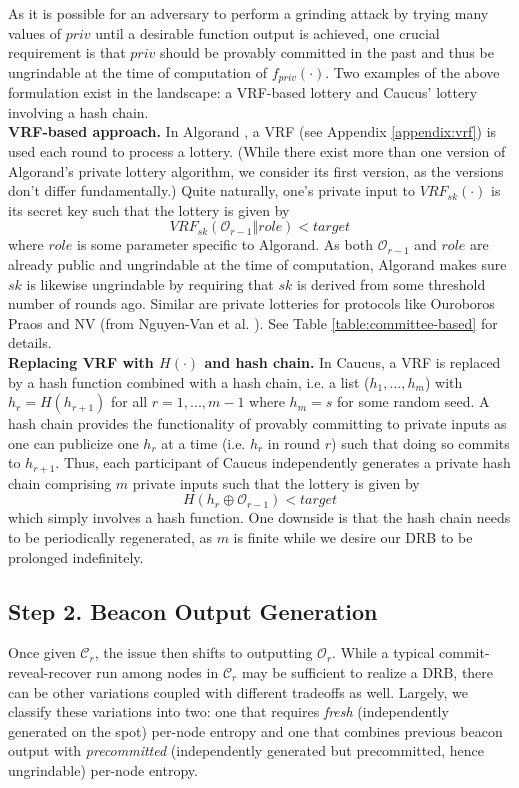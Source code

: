 \documentclass[letterpaper,twocolumn,10pt]{article}
\theoremstyle{definition}
\theoremstyle{remark}
\begin{document}
As it is possible for an adversary to perform a grinding attack by trying many values of $priv$ until a desirable function output is achieved, one crucial requirement is that $priv$ should be provably committed in the past and thus be ungrindable at the time of computation of $f_{priv}(\cdot)$. Two examples of the above formulation exist in the landscape: a VRF-based lottery and Caucus' \cite{azouvi2018winning} lottery involving a hash chain.\\

\noindent\textbf{VRF-based approach.} In Algorand \cite{gilad2017algorand}, a VRF (see Appendix \ref{appendix:vrf}) is used each round to process a lottery. (While there exist more than one version of Algorand's private lottery algorithm, we consider its first version, as the versions don't differ fundamentally.) Quite naturally, one's private input to $VRF_{sk}(\cdot)$ is its secret key such that the lottery is given by
\[
VRF_{sk}(\mathcal{O}_{r - 1} \mathbin\Vert role) < target
\]
where $role$ is some parameter specific to Algorand. As both $\mathcal{O}_{r - 1}$ and $role$ are already public and ungrindable at the time of computation, Algorand makes sure $sk$ is likewise ungrindable by requiring that $sk$ is derived from some threshold number of rounds ago. Similar are private lotteries for protocols like Ouroboros Praos \cite{david2018ouroboros} and NV (from Nguyen-Van et al. \cite{nguyen2019scalable}). See Table \ref{table:committee-based} for details.\\

\noindent\textbf{Replacing VRF with $H(\cdot)$ and hash chain.} In Caucus, a VRF is replaced by a hash function combined with a hash chain, i.e. a list ($h_1, ..., h_m$) with $h_r = H(h_{r + 1})$ for all $r = 1, ..., m - 1$ where $h_m = s$ for some random seed. A hash chain provides the functionality of provably committing to private inputs as one can publicize one $h_r$ at a time (i.e. $h_r$ in round $r$) such that doing so commits to $h_{r + 1}$. Thus, each participant of Caucus independently generates a private hash chain comprising $m$ private inputs such that the lottery is given by
\[
H(h_r \oplus \mathcal{O}_{r - 1}) < target
\]
which simply involves a hash function. One downside is that the hash chain needs to be periodically regenerated, as $m$ is finite while we desire our DRB to be prolonged indefinitely.

\subsection{Step 2. Beacon Output Generation}
\label{subsection:beacon-output-generation}
Once given $\mathcal{C}_r$, the issue then shifts to outputting $\mathcal{O}_r$. While a typical commit-reveal-recover run among nodes in $\mathcal{C}_r$ may be sufficient to realize a DRB, there can be other variations coupled with different tradeoffs as well. Largely, we classify these variations into two: one that requires \textit{fresh} (independently generated on the spot) per-node entropy and one that combines previous beacon output with \textit{precommitted} (independently generated but precommitted, hence ungrindable) per-node entropy.
\end{document}
